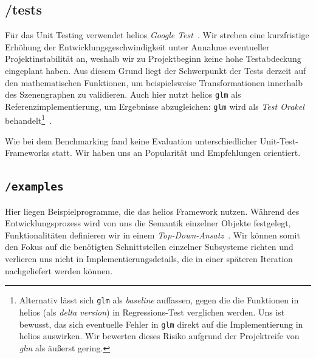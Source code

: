 \subsection*{/tests}
\noindent
Für das Unit Testing verwendet helios \textit{Google Test}~\cite[]{googletestgithub}.
Wir streben eine kurzfristige Erhöhung der Entwicklungsgeschwindigkeit unter Annahme eventueller Projektinstabilität an, weshalb wir zu Projektbeginn keine hohe Testabdeckung eingeplant haben.
Aus diesem Grund liegt der Schwerpunkt der Tests derzeit auf den mathematischen Funktionen, um beispielsweise Transformationen innerhalb des Szenengraphen zu validieren. Auch hier nutzt helios \texttt{glm} als Referenzimplementierung, um Ergebnisse abzugleichen: \texttt{glm} wird als \textit{Test Orakel} behandelt\footnote{
    Alternativ lässt sich \texttt{glm} als \textit{baseline} auffassen, gegen die die Funktionen in helios (als \textit{delta version}) in Regressions-Test verglichen werden. Uns ist bewusst, das sich eventuelle Fehler in \texttt{glm} direkt auf die Implementierung in helios auswirken. Wir bewerten dieses Risiko aufgrund der Projektreife von \textit{glm} als äußerst gering.
}~\cite[917 ff.]{Bin99}.


\noindent
Wie bei dem Benchmarking fand keine Evaluation unterschiedlicher Unit-Test-Frameworks statt.
Wir haben uns an Popularität und Empfehlungen orientiert.

\subsection*{\texttt{/examples}}
Hier liegen Beispielprogramme, die das helios Framework nutzen.
Während des Entwicklungsprozess wird von uns die Semantik einzelner Objekte festgelegt, Funktionalitäten definieren wir in einem \textit{Top-Down-Ansatz}~\cite[]{Wir71}.
Wir können somit den Fokus auf die benötigten Schnittstellen einzelner Subsysteme richten und verlieren uns nicht in Implementierungsdetails, die in einer späteren Iteration nachgeliefert werden können.

